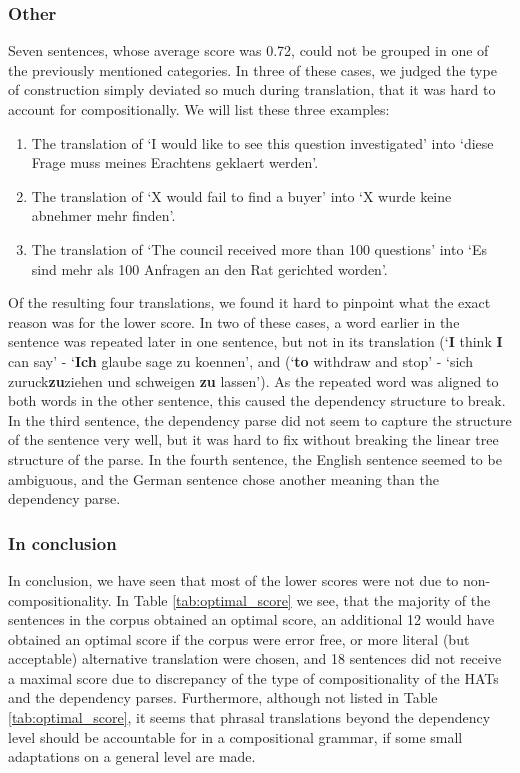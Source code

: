 \subsubsection{Other}

Seven sentences, whose average score was 0.72, could not be grouped in one of the previously mentioned categories. In three of these cases, we judged the type of construction simply deviated so much during translation, that it was hard to account for compositionally. We will list these three examples:\begin{enumerate}
\item The translation of `I would like to see this question investigated' into `diese Frage muss meines Erachtens geklaert werden'.
\item The translation of `X would fail to find a buyer' into `X wurde keine abnehmer mehr finden'.
\item The translation of `The council received more than 100 questions' into `Es sind mehr als 100 Anfragen an den Rat gerichted worden'.
\end{enumerate} 

Of the resulting four translations, we found it hard to pinpoint what the exact reason was for the lower score. In two of these cases, a word earlier in the sentence was repeated later in one sentence, but not in its translation (`\textbf{I} think \textbf{I} can say' - `\textbf{Ich} glaube sage zu koennen', and (`\textbf{to} withdraw and stop' - `sich zuruck\textbf{zu}ziehen und schweigen \textbf{zu} lassen'). As the repeated word was aligned to both words in the other sentence, this caused the dependency structure to break. In the third sentence, the dependency parse did not seem to capture the structure of the sentence very well, but it was hard to fix without breaking the linear tree structure of the parse. In the fourth sentence, the English sentence seemed to be ambiguous, and the German sentence chose another meaning than the dependency parse.

\subsubsection{In conclusion}

In conclusion, we have seen that most of the lower scores were not due to non-compositionality. In Table \ref{tab:optimal_score} we see, that the majority of the sentences in the corpus obtained an optimal score, an additional 12 would have obtained an optimal score if the corpus were error free, or more literal (but acceptable) alternative translation were chosen, and 18 sentences did not receive a maximal score due to discrepancy of the type of compositionality of the HATs and the dependency parses. Furthermore, although not listed in Table \ref{tab:optimal_score}, it seems that phrasal translations beyond the dependency level should be accountable for in a compositional grammar, if some small adaptations on a general level are made.

